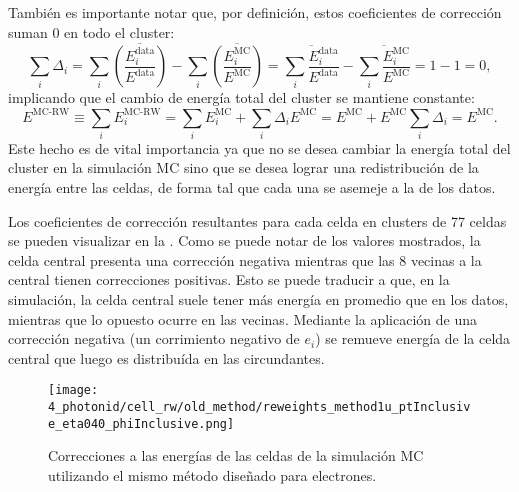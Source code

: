 También es importante notar que, por definición, estos coeficientes de corrección suman 0 en todo el cluster:
\begin{equation*}
    \sum_i \Delta_i = \sum_i \overline{\left( \frac{ E_i^{\text{data}} }{ E^{\text{data}} } \right)} - \sum_i \overline{\left( \frac{ E_i^{\text{MC}} }{ E^{\text{MC}} } \right)}
    = \overline{\sum_i \frac{ E_i^{\text{data}} }{ E^{\text{data}} }} - \overline{\sum_i \frac{ E_i^{\text{MC}} }{ E^{\text{MC}} }}
    = 1 - 1 = 0,
\end{equation*}
implicando que el cambio de energía total del cluster se mantiene constante:
\begin{equation*}
    E^{\text{MC-RW}} \equiv \sum_i E_i^{\text{MC-RW}}
    = \sum_i E_i^{\text{MC}} + \sum_i \Delta_i E^{\text{MC}} = E^{\text{MC}} + E^{\text{MC}} \sum_i \Delta_i = E^{\text{MC}}.
\end{equation*}
Este hecho es de vital importancia ya que no se desea cambiar la energía total del cluster en la simulación \ac{MC} sino que se desea lograr una redistribución de la energía entre las celdas, de forma tal que cada una se asemeje a la de los datos.

Los coeficientes de corrección resultantes para cada celda en clusters de 77 celdas se pueden visualizar en la \Fig{\ref{fig:ss_corrections:cell_rw:calculation:previous:reweights}}. Como se puede notar de los valores mostrados, la celda central presenta una corrección negativa mientras que las 8 vecinas a la central tienen correcciones positivas. Esto se puede traducir a que, en la simulación, la celda central suele tener más energía en promedio que en los datos, mientras que lo opuesto ocurre en las vecinas. Mediante la aplicación de una corrección negativa (un corrimiento negativo de \(e_i\)) se remueve energía de la celda central que luego es distribuída en las circundantes.

\begin{figure}[htbp]
    \centering
    \texttt{[image: 4\_photonid/cell\_rw/old\_method/reweights\_method1u\_ptInclusive\_eta040\_phiInclusive.png]}
    \caption{Correcciones a las energías de las celdas de la simulación \ac{MC} utilizando el mismo método diseñado para electrones.}
    \label{fig:ss_corrections:cell_rw:calculation:previous:reweights}
\end{figure}

